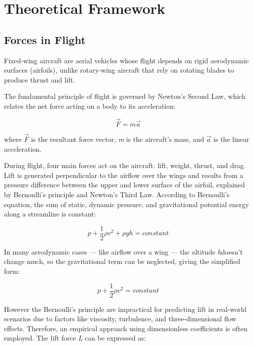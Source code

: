 \chapter{Theoretical Framework}

\section{Forces in Flight}

Fixed-wing aircraft are aerial vehicles whose flight depends on rigid aerodynamic surfaces (airfoils), unlike rotary-wing aircraft that rely on rotating blades to produce thrust and lift.

The fundamental principle of flight is governed by Newton's Second Law, which relates the net force acting on a body to its acceleration:

\begin{equation}
    \vec{F} = m\vec{a}
\end{equation}

where $\vec{F}$ is the resultant force vector, \textit{m} is the aircraft's mass, and $\vec{a}$ is the linear acceleration.

During flight, four main forces act on the aircraft: lift, weight, thrust, and drag. Lift is generated perpendicular to the airflow over the wings and results from a pressure difference between the upper and lower surface of the airfoil, explained by Bernoulli's principle and Newton's Third Law. According to Bernoulli's equation, the sum of static, dynamic pressure, and gravitational potential energy along a streamline is constant:

\begin{equation}
    p + \frac{1}{2} \rho v^2 + \rho g h = constant
\end{equation}

In many aerodynamic cases — like airflow over a wing — the altitude \textit{h}doesn’t change much, so the gravitational term can be neglected, giving the simplified form:

\begin{equation}
    p + \frac{1}{2} \rho v^2 = constant
\end{equation}

However the Bernoulli's principle are impractical for predicting lift in real-world scenarios due to factors like viscosity, turbulence, and three-dimensional flow effects. Therefore, an empirical approach using dimensionless coefficients is often employed. The lift force \textit{L} can be expressed as:

